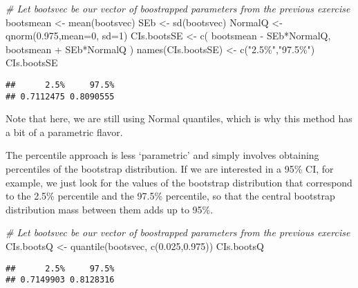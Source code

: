 \documentclass[
]{book}
\newenvironment{Shaded}{\begin{snugshade}}{\end{snugshade}}
\newcommand{\AttributeTok}[1]{\textcolor[rgb]{0.77,0.63,0.00}{#1}}
\newcommand{\CommentTok}[1]{\textcolor[rgb]{0.56,0.35,0.01}{\textit{#1}}}
\newcommand{\DecValTok}[1]{\textcolor[rgb]{0.00,0.00,0.81}{#1}}
\newcommand{\FloatTok}[1]{\textcolor[rgb]{0.00,0.00,0.81}{#1}}
\newcommand{\FunctionTok}[1]{\textcolor[rgb]{0.00,0.00,0.00}{#1}}
\newcommand{\NormalTok}[1]{#1}
\newcommand{\OtherTok}[1]{\textcolor[rgb]{0.56,0.35,0.01}{#1}}
\newcommand{\SpecialCharTok}[1]{\textcolor[rgb]{0.00,0.00,0.00}{#1}}
\newcommand{\StringTok}[1]{\textcolor[rgb]{0.31,0.60,0.02}{#1}}
\begin{document}
\begin{Shaded}
\begin{Highlighting}[]
\CommentTok{\# Let bootsvec be our vector of boostrapped parameters from the previous exercise}
\NormalTok{bootsmean }\OtherTok{\textless{}{-}} \FunctionTok{mean}\NormalTok{(bootsvec)}
\NormalTok{SEb }\OtherTok{\textless{}{-}} \FunctionTok{sd}\NormalTok{(bootsvec)}
\NormalTok{NormalQ }\OtherTok{\textless{}{-}} \FunctionTok{qnorm}\NormalTok{(}\FloatTok{0.975}\NormalTok{,}\AttributeTok{mean=}\DecValTok{0}\NormalTok{, }\AttributeTok{sd=}\DecValTok{1}\NormalTok{)}
\NormalTok{CIs.bootsSE }\OtherTok{\textless{}{-}} \FunctionTok{c}\NormalTok{( bootsmean }\SpecialCharTok{{-}}\NormalTok{ SEb}\SpecialCharTok{*}\NormalTok{NormalQ, bootsmean }\SpecialCharTok{+}\NormalTok{ SEb}\SpecialCharTok{*}\NormalTok{NormalQ )}
\FunctionTok{names}\NormalTok{(CIs.bootsSE) }\OtherTok{\textless{}{-}} \FunctionTok{c}\NormalTok{(}\StringTok{"2.5\%"}\NormalTok{,}\StringTok{"97.5\%"}\NormalTok{)}
\NormalTok{CIs.bootsSE}
\end{Highlighting}
\end{Shaded}

\begin{verbatim}
##      2.5%     97.5% 
## 0.7112475 0.8090555
\end{verbatim}

Note that here, we are still using Normal quantiles, which is why this method has a bit of a parametric flavor.

The percentile approach is less `parametric' and simply involves obtaining percentiles of the bootstrap distribution. If we are interested in a 95\% CI, for example, we just look for the values of the bootstrap distribution that correspond to the 2.5\% percentile and the 97.5\% percentile, so that the central bootstrap distribution mass between them adds up to 95\%.

\begin{Shaded}
\begin{Highlighting}[]
\CommentTok{\# Let bootsvec be our vector of boostrapped parameters from the previous exercise}
\NormalTok{CIs.bootsQ }\OtherTok{\textless{}{-}} \FunctionTok{quantile}\NormalTok{(bootsvec, }\FunctionTok{c}\NormalTok{(}\FloatTok{0.025}\NormalTok{,}\FloatTok{0.975}\NormalTok{))}
\NormalTok{CIs.bootsQ}
\end{Highlighting}
\end{Shaded}

\begin{verbatim}
##      2.5%     97.5% 
## 0.7149903 0.8128316
\end{verbatim}
\end{document}
